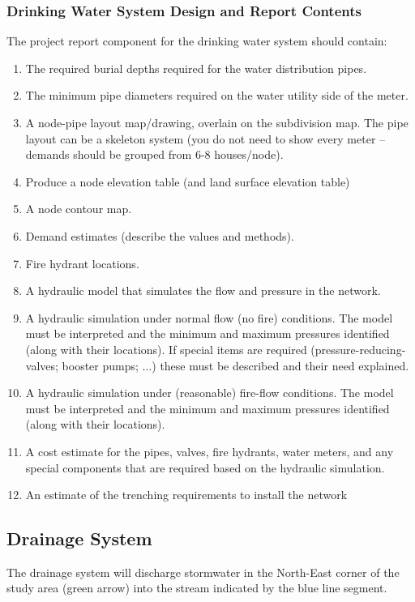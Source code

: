 \documentclass[12pt]{article}
\begin{document}
\subsubsection{\small{Drinking Water System Design and Report Contents}}
The project report component for the drinking water system should contain:
\begin{enumerate}
\item The required burial depths required for the water distribution pipes.
\item The minimum pipe diameters required on the water utility side of the meter.
\item A node-pipe layout map/drawing, overlain on the subdivision map.   The pipe layout can be a skeleton system (you do not need to show every meter -- demands should be grouped from 6-8 houses/node).
\item Produce a node elevation table (and land surface elevation table)
\item A node contour map.
\item Demand estimates (describe the values and methods).
\item Fire hydrant locations.
\item A hydraulic model that simulates the flow and pressure in the network.  
\item A hydraulic simulation under normal flow (no fire) conditions.  The model must be interpreted and the minimum and maximum pressures identified (along with their locations).  If special items are required (pressure-reducing-valves; booster pumps; $\dots$) these must be described and their need explained.
\item A hydraulic simulation under (reasonable) fire-flow conditions.  The model must be interpreted and the minimum and maximum pressures identified (along with their locations).
\item A cost estimate for the pipes, valves, fire hydrants, water meters, and any special components that are required based on the hydraulic simulation.   
\item An estimate of the trenching requirements to install the network
\end{enumerate}

\subsection{\small{Drainage System}}
The drainage system will discharge stormwater in the North-East corner of the study area (green arrow) into the stream indicated by the blue line segment.
\end{document}
